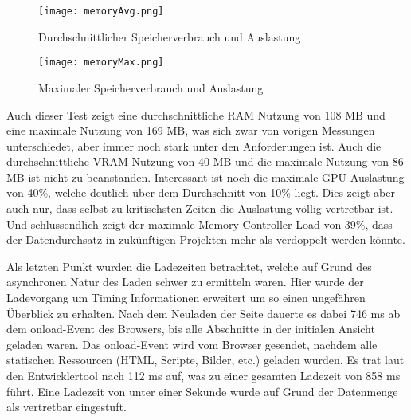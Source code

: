 \begin{figure}[H]
  \begin{minipage}{0.5\textwidth}
    \texttt{[image: memoryAvg.png]}
    \caption{Durchschnittlicher Speicherverbrauch und Auslastung}
    \label{memoryAvg}
  \end{minipage}
  \begin{minipage}{0.5\textwidth}
    \texttt{[image: memoryMax.png]}
    \caption{Maximaler Speicherverbrauch und Auslastung}
    \label{memoryMax}
  \end{minipage}
\end{figure}

Auch dieser Test zeigt eine durchschnittliche RAM Nutzung von 108 MB und eine maximale Nutzung von 169 MB, was sich zwar von vorigen Messungen unterschiedet, aber immer noch stark unter den Anforderungen ist. Auch die durchschnittliche VRAM Nutzung von 40 MB und die maximale Nutzung von 86 MB ist nicht zu beanstanden. Interessant ist noch die maximale GPU Auslastung von 40\%, welche deutlich über dem Durchschnitt von 10\% liegt. Dies zeigt aber auch nur, dass selbst zu kritischsten Zeiten die Auslastung völlig vertretbar ist. Und schlussendlich zeigt der maximale Memory Controller Load von 39\%, dass der Datendurchsatz in zukünftigen Projekten mehr als verdoppelt werden könnte.

Als letzten Punkt wurden die Ladezeiten betrachtet, welche auf Grund des asynchronen Natur des Laden schwer zu ermitteln waren. Hier wurde der Ladevorgang um Timing Informationen erweitert um so einen ungefähren Überblick zu erhalten. Nach dem Neuladen der Seite dauerte es dabei 746 ms ab dem onload-Event des Browsers, bis alle Abschnitte in der initialen Ansicht geladen waren. Das onload-Event wird vom Browser gesendet, nachdem alle statischen Ressourcen (HTML, Scripte, Bilder, etc.) geladen wurden. Es trat laut den Entwicklertool nach 112 ms auf, was zu einer gesamten Ladezeit von 858 ms führt. Eine Ladezeit von unter einer Sekunde wurde auf Grund der Datenmenge als vertretbar eingestuft.